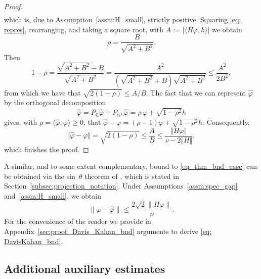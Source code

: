 \documentclass{aptpub}
\begin{document}
\begin{proof}
\begin{align*}
\end{align*}
which is, due to Assumption~\ref{assm:H_small}, strictly positive. 
Squaring \eqref{eq: repres}, rearranging, and taking a square root, with $A:=|\langle H \varphi ,h\rangle|$ we obtain
\begin{equation*}
    \rho = \frac{B}{\sqrt{A^2 + B^2}}.
\end{equation*}
Then
\begin{equation*}
    1-\rho = \frac{\sqrt{A^2+B^2}-B}{\sqrt{A^2+B^2}} = \frac{A^2}{(\sqrt{A^2+B^2}+B)\sqrt{A^2+B^2}}\le\frac{A^2}{2B^2},
\end{equation*}
from which we have that $\sqrt{2(1-\rho)}\le A/B$.
The fact that we can represent $\widehat \varphi$ by
	the orthogonal decomposition
	\begin{equation*}
	\widehat \varphi
	= P_{\mathbb{G}} \widehat \varphi +P_{\mathbb{G}^\perp} \widehat \varphi
	=
	\rho\, \varphi + \sqrt{1-\rho^2 } h
	\end{equation*}
 gives, with $\rho = \langle \widehat \varphi, \varphi\rangle \ge 0$, that
$
\widehat \varphi - \varphi = (\rho-1)\varphi + \sqrt{1-\rho^2} h.
$
Consequently, 
\[
\Vert \widehat\varphi -\varphi \Vert = \sqrt{2(1-\rho)} \leq \frac{A}{B} \leq \frac{\Vert H\varphi \Vert}{\nu - 2\Vert H \Vert},
\]
which finishes the proof.


\end{proof}


\begin{remark} \label{rem:bdd_DK}
	A similar, and to some extent complementary, bound to \eqref{eq_thm_bnd_case} can be obtained via the sin~$\theta$ theorem of \cite{DavisKahan1970}, which is stated in Section~\ref{subsec:projection_notation}.
	Under Assumptions~\ref{assm:spec_gap} and~\ref{assm:H_small}, we obtain
	\begin{equation}
	\label{eq: DavisKahan_bnd}
	\|\varphi-\widehat \varphi\| \le \frac{2\sqrt{2}\|H\varphi\|}{\nu}.
	\end{equation}
	For the convenience of the reader we provide in Appendix~\ref{sec:proof_Davis_Kahan_bnd} arguments to derive \eqref{eq: DavisKahan_bnd}.
\end{remark}


\subsection{Additional auxiliary estimates}
\end{document}

